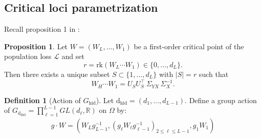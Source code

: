 \documentclass{article}
\newcommand{\hid}{\operatorname{hid}}
\newcommand{\dhid}{\operatorname{d_{hid}}}
\newcommand{\R}{\mathbb{R}}
\theoremstyle{definition}
\newtheorem{proposition}[theorem]{Proposition}
\newtheorem{definition}[theorem]{Definition}
\begin{document}
\subsection{Critical loci parametrization}
Recall proposition 1 in \cite{achour2024loss}:
\begin{proposition}\label{prop:dln-critical-points-project}
Let $W = (W_L, \dots, W_1)$ be a first-order critical point of the population loss $\mathcal{L}$ and set
\[
r = \text{rk}(W_L \cdots W_1) \in \{ 0, \dots, d_L \}.
\]
Then there exists a unique subset $S \subset \{ 1, \dots, d_L \}$ with $|S| = r$ such that
\[
W_H \cdots W_1 = U_S U_S^\top \, \Sigma_{YX} \, \Sigma_{X}^{-1}.
\]
\end{proposition}
\begin{definition}[Action of $G_{\hid}$] Let $\dhid = (d_1, \dots, d_{L-1})$. Define a group action of $G_{\dhid} = \prod_{\ell=1}^{L-1} GL(d_\ell,\R)$ on $\Omega$ by:
\begin{align*}
    g\cdot W = (W_Lg_{L-1}^{-1}, (g_\ell W_\ell g_{\ell-1}^{-1})_{2\leq \ell \leq L-1}, g_1W_1)
\end{align*}
\end{definition}
\end{document}
